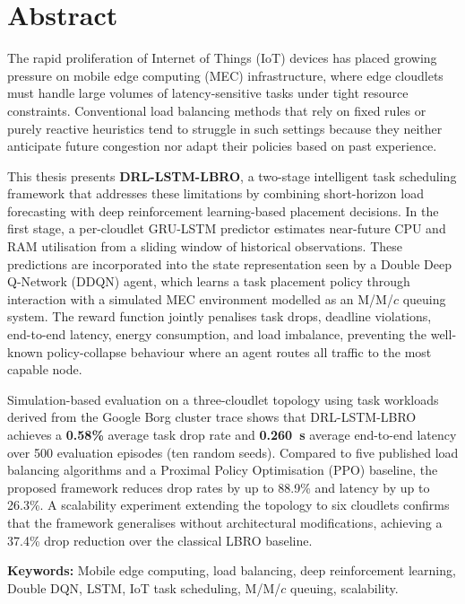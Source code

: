 \chapter*{Abstract}
\thispagestyle{plain}

The rapid proliferation of Internet of Things (IoT) devices has placed
growing pressure on mobile edge computing (MEC) infrastructure, where
edge cloudlets must handle large volumes of latency-sensitive tasks
under tight resource constraints. Conventional load balancing methods
that rely on fixed rules or purely reactive heuristics tend to
struggle in such settings because they neither anticipate future
congestion nor adapt their policies based on past experience.

This thesis presents \textbf{DRL-LSTM-LBRO}, a two-stage intelligent
task scheduling framework that addresses these limitations by combining
short-horizon load forecasting with deep reinforcement learning-based
placement decisions. In the first stage, a per-cloudlet GRU-LSTM
predictor estimates near-future CPU and RAM utilisation from a sliding
window of historical observations. These predictions are incorporated
into the state representation seen by a Double Deep Q-Network (DDQN)
agent, which learns a task placement policy through interaction with a
simulated MEC environment modelled as an M/M/$c$ queuing system. The
reward function jointly penalises task drops, deadline violations,
end-to-end latency, energy consumption, and load imbalance, preventing
the well-known policy-collapse behaviour where an agent routes all
traffic to the most capable node.

Simulation-based evaluation on a three-cloudlet topology using task
workloads derived from the Google Borg cluster trace shows that
DRL-LSTM-LBRO achieves a \textbf{0.58\%} average task drop rate and
\textbf{0.260~s} average end-to-end latency over 500 evaluation
episodes (ten random seeds). Compared to five published load balancing
algorithms and a Proximal Policy Optimisation (PPO) baseline, the
proposed framework reduces drop rates by up to 88.9\% and latency by
up to 26.3\%. A scalability experiment extending the topology to six
cloudlets confirms that the framework generalises without architectural
modifications, achieving a 37.4\% drop reduction over the classical
LBRO baseline.

\vspace{0.5cm}
\noindent\textbf{Keywords:} Mobile edge computing, load balancing,
deep reinforcement learning, Double DQN, LSTM, IoT task scheduling,
M/M/$c$ queuing, scalability.

